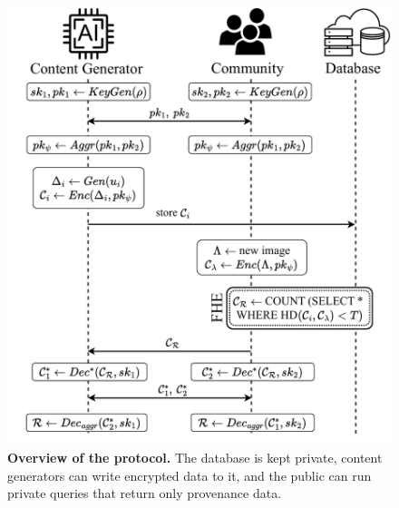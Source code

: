 \begin{figure}[t]
  \centering
  \includegraphics[width=0.9\linewidth,trim={.5cm 0 0 0},clip]{figures/protocol.pdf}
   \caption{\textbf{Overview of the protocol.} The database is kept private, content generators can write encrypted data to it, and the public can run private queries that return only provenance data.}
   \label{fig:protocol}
   \vspace{-0.5cm}
\end{figure}



\vspace{-0.5cm}
